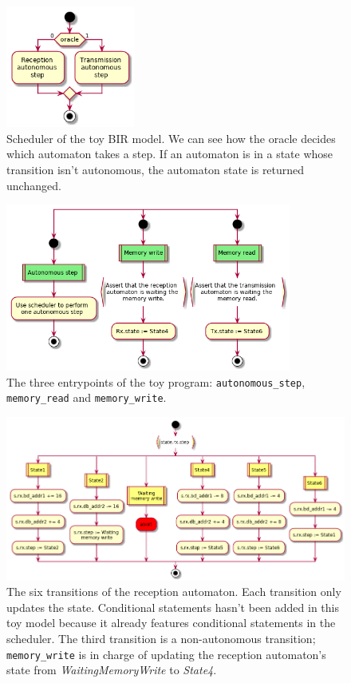 \documentclass{kththesis}
\begin{document}
{\begin{figure}[p]
	\includegraphics[height=4cm]{figures/alice-bob-scheduler-oracle.png}
	\centering
	\caption{Scheduler of the toy BIR model. We can see how the oracle decides which automaton takes a step. If an automaton is in a state whose transition isn't autonomous, the automaton state is returned unchanged.}
	\label{alice-bob-scheduler-oracle}
\end{figure}

\begin{figure}[p]
	\includegraphics[height=5.5cm]{figures/alice-bob-entrypoints.png}
	\centering
	\caption{The three entrypoints of the toy program: \texttt{autonomous\_step}, \texttt{memory\_read} and \texttt{memory\_write}.}
	\label{alice-bob-entrypoints}
\end{figure}

\begin{figure}[p]
	\includegraphics[width=\textwidth]{figures/alice-bob-alice_autonomous_transitions.png}
	\centering
	\caption{The six transitions of the reception automaton. Each transition only updates the state. Conditional statements hasn't been added in this toy model because it already features conditional statements in the scheduler. The third transition is a non-autonomous transition; \texttt{memory\_write} is in charge of updating the reception automaton's state from \textit{WaitingMemoryWrite} to \textit{State4}.}
	\label{alice-bob-alice_autonomous_transitions}
\end{figure}

}
\end{document}

